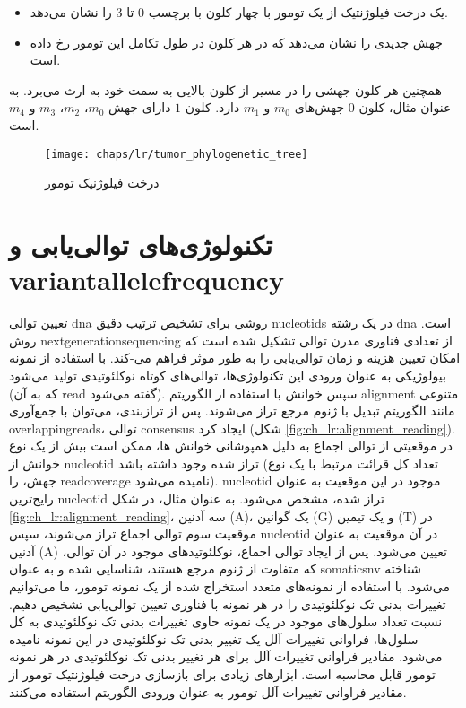 \begin{itemize}
	\item یک درخت فیلوژنتیک از یک تومور با چهار کلون با برچسب $0$ تا $3$ را نشان می‌دهد.
	\item جهش جدیدی را نشان می‌دهد که در هر کلون در طول تکامل این تومور رخ داده است.
\end{itemize}

 همچنین هر کلون جهشی را در مسیر از کلون بالایی به سمت خود به ارث می‌برد. به عنوان مثال، کلون $0$ جهش‌های
  $m_0$ و	 $m_1$ دارد. کلون $1$ دارای جهش $m_0$، $m_2$، $m_3$ و $m_4$ است.
 
\begin{figure}[!ht]
	\centerline{\texttt{[image: chaps/lr/tumor\_phylogenetic\_tree]}}
	\caption{درخت فیلوژنیک تومور}
	\label{fig:ch_lr:tumor_phylogenetic_tree}
\end{figure}


\section{تکنولوژی‌های توالی‌یابی و \gls{variantallelefrequency}}




تعیین توالی \gls{dna} روشی برای تشخیص ترتیب دقیق \glspl{nucleotid} در یک رشته \gls{dna} است. روش \gls{nextgenerationsequencing}  از تعدادی فناوری مدرن توالی تشکیل شده است که امکان تعیین هزینه و زمان توالی‌یابی را به طور موثر فراهم می-کند. با استفاده از نمونه بیولوژیکی به عنوان ورودی این تکنولوژی‌ها، توالی‌های کوتاه نوکلئوتیدی تولید می‌شود (که به آن \gls{read}  گفته می‌شود). سپس خوانش با استفاده از الگوریتم \gls{alignment}  متنوعی مانند الگوریتم تبدیل  با ژنوم مرجع تراز می‌شوند. پس از ترازبندی، می‌توان با جمع‌آوری \glspl{overlappingread}،  توالی \gls{consensus}  ایجاد کرد (شکل \ref{fig:ch_lr:alignment_reading}). در موقعیتی از توالی اجماع به دلیل همپوشانی خوانش ها، ممکن است بیش از یک نوع خوانش از \gls{nucleotid} تراز شده وجود داشته باشد (تعداد کل قرائت مرتبط با یک نوع جهش، را \gls{readcoverage}  نامیده می‌شود). \gls{nucleotid} موجود در این موقعیت به عنوان رایج‌ترین \gls{nucleotid} تراز شده، مشخص می‌شود. به عنوان مثال، در شکل \ref{fig:ch_lr:alignment_reading}، سه آدنین (A)، یک گوانین (G) و یک تیمین (T)  در موقعیت سوم توالی اجماع تراز می‌شوند، سپس \gls{nucleotid} در آن موقعیت به عنوان آدنین (A) تعیین می‌شود. پس از ایجاد توالی اجماع، نوکلئوتیدهای موجود در آن توالی، که متفاوت از ژنوم مرجع هستند، شناسایی شده و به عنوان \gls{somaticsnv}  شناخته می‌شود. با استفاده از نمونه‌های متعدد استخراج شده از یک نمونه تومور، ما می‌توانیم تغییرات بدنی تک نوکلئوتیدی را در هر نمونه با فناوری تعیین توالی‌یابی تشخیص دهیم. نسبت تعداد سلول‌های موجود در یک نمونه حاوی تغییرات بدنی تک نوکلئوتیدی به کل سلول‌ها، فراوانی تغییرات آلل یک تغییر بدنی تک نوکلئوتیدی در این نمونه نامیده می‌شود. مقادیر فراوانی تغییرات آلل برای هر تغییر بدنی تک نوکلئوتیدی  در هر نمونه تومور قابل محاسبه است. ابزارهای زیادی برای بازسازی درخت فیلوژنتیک تومور از مقادیر فراوانی تغییرات آلل تومور به عنوان ورودی الگوریتم استفاده می‌کنند.



